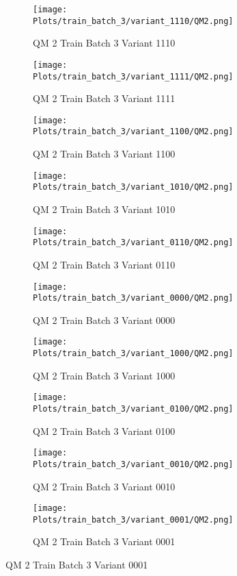 \documentclass{DissertateFigs}
\begin{document}
\begin{figure}[t!]
    \begin{subfigure}{0.47\textwidth}
    \texttt{[image: Plots/train\_batch\_3/variant\_1110/QM2.png]}
    \caption{QM 2 Train Batch 3 Variant 1110}
    \end{subfigure}
    \begin{subfigure}{0.47\textwidth}
    \texttt{[image: Plots/train\_batch\_3/variant\_1111/QM2.png]}
    \caption{QM 2 Train Batch 3 Variant 1111}
    \end{subfigure}

\medskip

    \begin{subfigure}{0.47\textwidth}
    \texttt{[image: Plots/train\_batch\_3/variant\_1100/QM2.png]}
    \caption{QM 2 Train Batch 3 Variant 1100}
    \end{subfigure}
    \begin{subfigure}{0.47\textwidth}
    \texttt{[image: Plots/train\_batch\_3/variant\_1010/QM2.png]}
    \caption{QM 2 Train Batch 3 Variant 1010}
    \end{subfigure}

\medskip

    \begin{subfigure}{0.47\textwidth}
    \texttt{[image: Plots/train\_batch\_3/variant\_0110/QM2.png]}
    \caption{QM 2 Train Batch 3 Variant 0110}
    \end{subfigure}
    \begin{subfigure}{0.47\textwidth}
    \texttt{[image: Plots/train\_batch\_3/variant\_0000/QM2.png]}
    \caption{QM 2 Train Batch 3 Variant 0000}
    \end{subfigure}

\medskip

    \begin{subfigure}{0.47\textwidth}
    \texttt{[image: Plots/train\_batch\_3/variant\_1000/QM2.png]}
    \caption{QM 2 Train Batch 3 Variant 1000}
    \end{subfigure}
    \begin{subfigure}{0.47\textwidth}
    \texttt{[image: Plots/train\_batch\_3/variant\_0100/QM2.png]}
    \caption{QM 2 Train Batch 3 Variant 0100}
    \end{subfigure}

\medskip

    \begin{subfigure}{0.47\textwidth}
    \texttt{[image: Plots/train\_batch\_3/variant\_0010/QM2.png]}
    \caption{QM 2 Train Batch 3 Variant 0010}
    \end{subfigure}
    \begin{subfigure}{0.47\textwidth}
    \texttt{[image: Plots/train\_batch\_3/variant\_0001/QM2.png]}
    \caption{QM 2 Train Batch 3 Variant 0001}
    \end{subfigure}


\end{figure}
\end{document}
